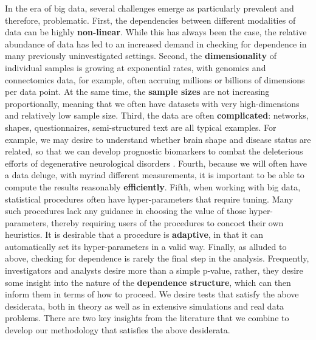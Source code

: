 \documentclass[11pt]{article}
\newcommand{\note}[2][]{\added[#1,remark={#2}]{}}
\newcommand{\jv}[1]{{\note{jv: #1}}}
\begin{document}
In the era of big data, several challenges emerge as particularly prevalent and therefore, problematic.
%
First, the dependencies between different modalities of data can be highly \textbf{non-linear}.  While this has always been the case, the relative abundance of data has led to an increased demand in checking for dependence in many previously uninvestigated settings.
%
Second, the \textbf{dimensionality} of individual samples is growing at exponential rates, with genomics and connectomics data, for example, often accruing millions or billions of dimensions per data point. At the same time, the \textbf{sample sizes} are not increasing proportionally, meaning that we often have datasets with very high-dimensions and relatively low sample size.
%
Third, the data are often \textbf{complicated}: networks, shapes, questionnaires, semi-structured text are all typical examples.
For example, we may desire to understand whether brain shape and disease status are related, so that we can develop prognostic biomarkers to combat the deleterious efforts of degenerative neurological disorders \cite{ParkEtAl2008}.
%
%
Fourth, because we will often have a data deluge, with myriad different measurements, it is important to be able to compute the results reasonably \textbf{efficiently}.
%
Fifth, when working with big data, statistical procedures often have hyper-parameters that require tuning.  Many such procedures lack any guidance in choosing the value of those hyper-parameters, thereby requiring users of the procedures to concoct their own heuristics. It is desirable that a procedure is \textbf{adaptive}, in that it can automatically set its hyper-parameters in a valid way.
%
Finally, as alluded to above, checking for dependence is rarely the final step in the analysis.  Frequently, investigators and analysts desire more than a simple p-value, rather, they desire some insight into the nature of the \textbf{dependence structure}, which can then inform them in terms of how to proceed.
%
We desire tests that satisfy the above desiderata, both in theory as well as in extensive simulations and real data problems.
% 
\jv{remove this paragraph and integrate it into next paragraphs. above: here's what everyone wants.  next: here's what everyone's doing.}
% 
There are two key insights from the literature that we combine to develop our methodology that satisfies the above desiderata.  
\end{document}
